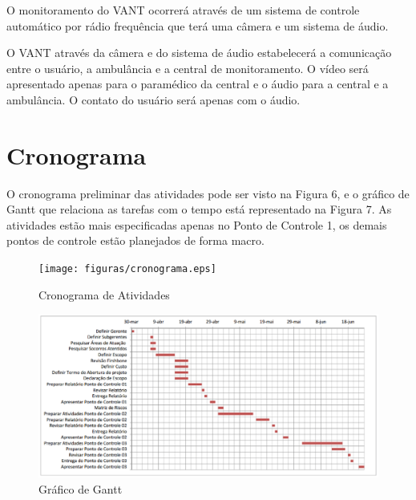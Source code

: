 O monitoramento do VANT ocorrerá através de um sistema de controle automático por rádio frequência que terá uma câmera e um sistema de áudio. 

O VANT através da câmera e do sistema de áudio estabelecerá a comunicação entre o usuário, a ambulância e a central de monitoramento. O vídeo será apresentado apenas para o paramédico da central e o áudio para a central e a ambulância. O contato do usuário será apenas com o áudio.

\section{Cronograma}
O cronograma preliminar das atividades pode ser visto na Figura 6, e o gráfico de Gantt que relaciona as tarefas com o tempo está representado na Figura 7. As atividades estão mais especificadas apenas no Ponto de Controle 1, os demais pontos de controle estão planejados de forma macro.

 \begin{figure}[ht]
	\centering
		\texttt{[image: figuras/cronograma.eps]}
	\caption{Cronograma de Atividades}
\end{figure}

 \begin{figure}[ht]
	\centering
		\includegraphics[keepaspectratio=true,scale=0.5]{figuras/gantt.eps}
	\caption{Gráfico de Gantt}
\end{figure}


